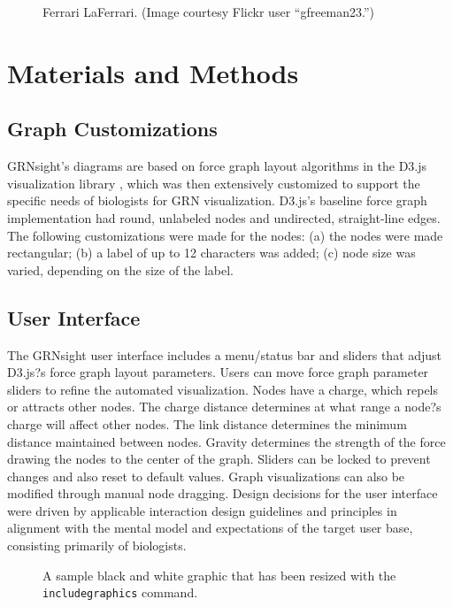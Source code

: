 \documentclass[sigconf,review,anonymous]{acmart}
\begin{document}
\begin{figure}[ht]
  \centering
  \caption{Ferrari LaFerrari. (Image courtesy Flickr user ``gfreeman23.'')}
  \label{fig:ferrari}
\end{figure}

\section{Materials and Methods}

\subsection{Graph Customizations}
GRNsight's diagrams are based on force graph layout algorithms in the D3.js visualization library \cite{d3}, which was then extensively customized to support the specific needs of biologists for GRN visualization. D3.js's baseline force graph implementation had round, unlabeled nodes and undirected, straight-line edges. The following customizations were made for the nodes: (a) the nodes were made rectangular; (b) a label of up to 12 characters was added; (c) node size was varied, depending on the size of the label.

\subsection{User Interface}
The GRNsight user interface includes a menu/status bar and sliders that adjust D3.js?s force graph layout parameters. Users can move force graph parameter sliders to refine the automated visualization. Nodes have a charge, which repels or attracts other nodes. The charge distance determines at what range a node?s charge will affect other nodes. The link distance determines the minimum distance maintained between nodes. Gravity determines the strength of the force drawing the nodes to the center of the graph. Sliders can be locked to prevent changes and also reset to default values. Graph visualizations can also be modified through manual node dragging. Design decisions for the user interface were driven by applicable interaction design guidelines and principles \cite{norman2013design,shneiderman2010designing,nielsen1994usability} in alignment with the mental model and expectations of the target user base, consisting primarily of biologists.

\begin{figure}[h]
\caption{A sample black and white graphic that has
been resized with the \texttt{includegraphics} command.}
\end{figure}
\end{document}
